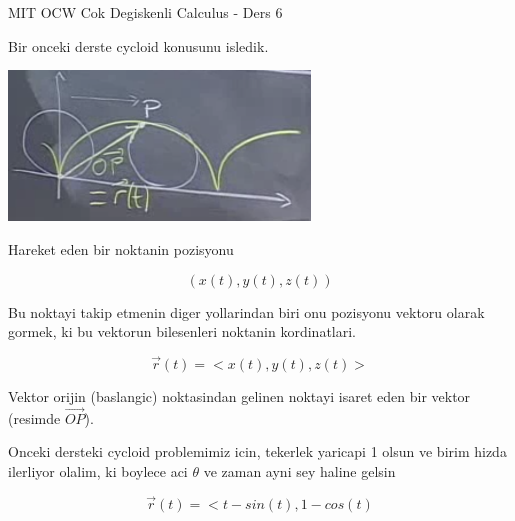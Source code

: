 \documentclass[12pt,fleqn]{article}
\begin{document}
MIT OCW Cok Degiskenli Calculus - Ders 6

Bir onceki derste cycloid konusunu isledik. 

\includegraphics[height=4cm]{6_1.png}

Hareket eden bir noktanin pozisyonu

\[ (x(t), y(t), z(t)) \]

Bu noktayi takip etmenin diger yollarindan biri onu pozisyonu vektoru
olarak gormek, ki bu vektorun bilesenleri noktanin kordinatlari. 

\[ \vec{r}(t) = <x(t),y(t),z(t)> \]

Vektor orijin (baslangic) noktasindan gelinen noktayi isaret eden bir
vektor (resimde $\vec{OP}$). 

Onceki dersteki cycloid problemimiz icin, tekerlek yaricapi 1 olsun ve
birim hizda ilerliyor olalim, ki boylece aci $\theta$ ve zaman ayni sey
haline gelsin

\[ \vec{r}(t) = <t-sin(t), 1-cos(t) \]
\end{document}
